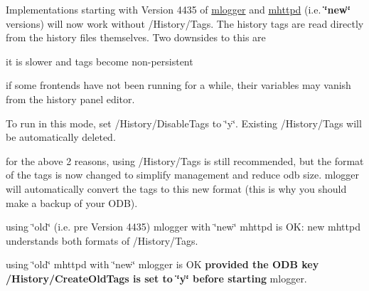 \begin{DoxyItemize}
\item Implementations starting with Version 4435 of \hyperlink{F_Logging_F_mlogger_utility}{mlogger} and \hyperlink{RC_mhttpd_utility}{mhttpd} (i.e. {\bfseries \char`\"{}new\char`\"{}} versions) will now work without /History/Tags.  The history tags are read directly from the history files themselves. Two downsides to this are 
\begin{DoxyEnumerate}
\item it is slower and tags become non-\/persistent 
\item if some frontends have not been running for a while, their variables may vanish from the history panel editor. 
\end{DoxyEnumerate}To run in this mode, set /History/DisableTags to \char`\"{}y\char`\"{}. Existing /History/Tags will be automatically deleted. 
\item for the above 2 reasons, using /History/Tags is still recommended, but the format of the tags is now changed to simplify management and reduce odb size. mlogger will automatically convert the tags to this new format (this is why you should make a backup of your ODB). 
\item using \char`\"{}old\char`\"{} (i.e. pre Version 4435) mlogger with \char`\"{}new\char`\"{} mhttpd is OK: new mhttpd understands both formats of /History/Tags. 
\item using \char`\"{}old\char`\"{} mhttpd with \char`\"{}new\char`\"{} mlogger is OK {\bfseries provided the ODB key /History/CreateOldTags is set to \char`\"{}y\char`\"{} before starting} mlogger. 
\end{DoxyItemize}

